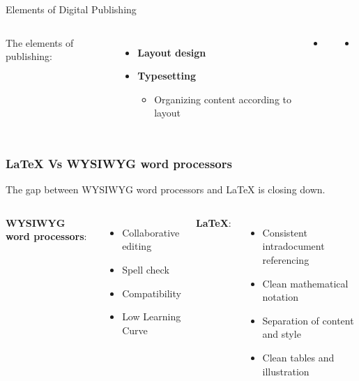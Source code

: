 \documentclass{beamer}
\begin{document}
\begin{frame}{Elements of Digital Publishing}
 \begin{columns}
  The elements of publishing:
  \begin{itemize}
   \item {\color{blue}\textbf{Layout design}}
   \item {\color{red}\textbf{Typesetting}}
   \begin{itemize}
     \item {\color{red}Organizing content according to layout}
   \end{itemize}
   \end{itemize}
   \begin{itemize}
   \item {\color{blue}{\Large \LaTeX}}
   \end{itemize}
   \vspace{2.5cm}
   \begin{itemize}
   \item {\color{red}{\Large \TeX}}
   \end{itemize}
 \end{columns}
\end{frame}


\begin{frame}
\frametitle{\LaTeX{} Vs WYSIWYG word processors}

The gap between WYSIWYG word processors and \LaTeX{} is closing down. 
\vspace{1cm}
\begin{columns}[t]
\textbf{WYSIWYG word processors}:
\begin{itemize}
 \item Collaborative editing
 \item Spell check
 \item Compatibility
 \item Low Learning Curve
\end{itemize}
{}
\textbf{\LaTeX{}}:
\begin{itemize}
  \item Consistent intradocument referencing 
  \item Clean mathematical notation
  \item Separation of content and style
  \item Clean tables and illustration
\end{itemize}
\end{columns}
\end{frame}
\end{document}

